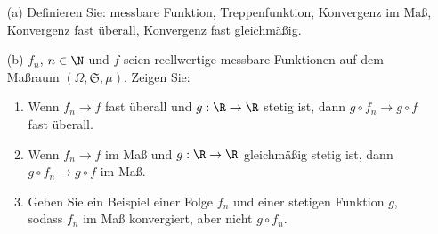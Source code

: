 
\begin{exercise}

\phantom{}

\begin{enumerate}[label = (\alph*)]

  \item[(a)] Definieren Sie: messbare Funktion, Treppenfunktion, Konvergenz im Maß, Konvergenz fast überall, Konvergenz fast gleichmäßig.

  \item[(b)] $f_n$, $n \in \N$ und $f$ seien reellwertige messbare Funktionen auf dem Maßraum $(\Omega, \mathfrak{S}, \mu)$. Zeigen Sie:

  \begin{enumerate}[label = \roman*.]

    \item
    Wenn $f_n \to f$ fast überall und $g: \R \to \R$ stetig ist, dann $g \circ f_n \to g \circ f$ fast überall.
    
    \item
    Wenn $f_n \to f$ im Maß und $g: \R \to \R$ gleichmäßig stetig ist, dann $g \circ f_n \to g \circ f$ im Maß.
    
    \item
    Geben Sie ein Beispiel einer Folge $f_n$ und einer stetigen Funktion $g$, sodass $f_n$ im Maß konvergiert, aber nicht $g \circ f_n$.

  \end{enumerate}

\end{enumerate}

\end{exercise}


